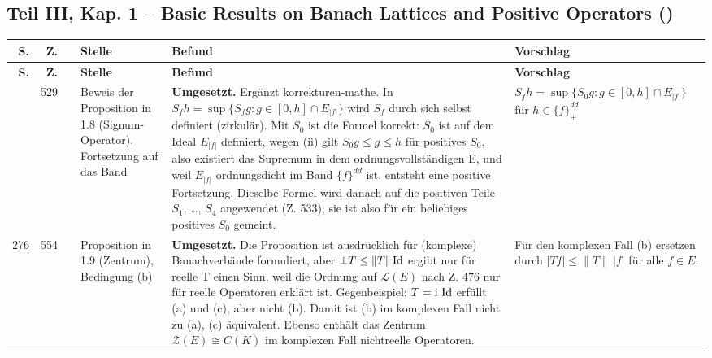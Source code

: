 \documentclass[10pt]{article}
\begin{document}
\subsection*{Teil III, Kap. 1 – Basic Results on Banach Lattices and Positive Operators ()}
\begin{longtable}{@{}rrc>{\RaggedRight\arraybackslash}p{3.0cm}>{\RaggedRight\arraybackslash}p{11.4cm}>{\RaggedRight\arraybackslash}p{7.4cm}@{}}
\toprule
\textbf{S.} & \textbf{Z.} & \textbf{} & \textbf{Stelle} & \textbf{Befund} & \textbf{Vorschlag} \\
\midrule
\endfirsthead
\toprule
\textbf{S.} & \textbf{Z.} & \textbf{} & \textbf{Stelle} & \textbf{Befund} & \textbf{Vorschlag} \\
\midrule
\endhead
\bottomrule
\endlastfoot
275 & 529 & \sichB{} & Beweis der Proposition in 1.8 (Signum-Operator), Fortsetzung auf das Band & \textbf{Umgesetzt.} Ergänzt korrekturen-mathe. In $S_{f}h = \sup \{ S_{f}g \colon g \in [0,h] \cap E_{\vert f\vert} \}$ wird $S_f$ durch sich selbst definiert (zirkulär). Mit $S_0$ ist die Formel korrekt: $S_0$ ist auf dem Ideal $E_{\vert f\vert}$ definiert, wegen (ii) gilt $S_{0}g \leq g \leq h$ für positives $S_0$, also existiert das Supremum in dem ordnungsvollständigen E, und weil $E_{\vert f\vert}$ ordnungsdicht im Band $\{f\}^{dd}$ ist, entsteht eine positive Fortsetzung. Dieselbe Formel wird danach auf die positiven Teile $S_1$, \dots{}, $S_4$ angewendet (Z. 533), sie ist also für ein beliebiges positives $S_0$ gemeint. & $S_{f}h = \sup \{ S_{0}g \colon g \in [0,h] \cap E_{\vert f\vert} \}$ für $h \in \{f\}^{dd}_{+}$ \\[2pt]
276 & 554 & \sichB{} & Proposition in 1.9 (Zentrum), Bedingung (b) & \textbf{Umgesetzt.} Die Proposition ist ausdrücklich für (komplexe) Banachverbände formuliert, aber $\pm T \leq \|T\| \Id$ ergibt nur für reelle T einen Sinn, weil die Ordnung auf $\mathcal{L}(E)$ nach Z. 476 nur für reelle Operatoren erklärt ist. Gegenbeispiel: $T = \mathrm{i}\,\operatorname{Id}$ erfüllt (a) und (c), aber nicht (b). Damit ist (b) im komplexen Fall nicht zu (a), (c) äquivalent. Ebenso enthält das Zentrum $\mathcal{Z}(E) \cong C(K)$ im komplexen Fall nichtreelle Operatoren. & Für den komplexen Fall (b) ersetzen durch $\vert Tf\vert \leq \|T\|\,\vert f\vert$ für alle $f \in E$. \\
\end{longtable}
\end{document}
